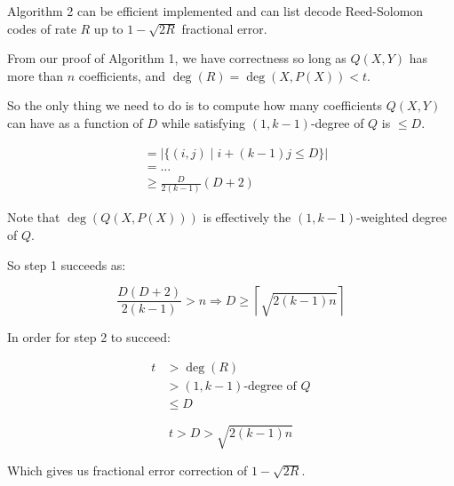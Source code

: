 \documentclass{idc_msc}
\begin{document}
Algorithm 2 can be efficient implemented and can list decode Reed-Solomon codes of rate \(R\) up to \(1 - \sqrt{2R}\) fractional error.

From our proof of Algorithm 1, we have correctness so long as \(Q(X,Y)\) has more than \(n\) coefficients, and \(\deg(R) = \deg(X,P(X)) < t\).

So the only thing we need to do is to compute how many coefficients \(Q(X,Y)\) can have as a function of \(D\) while satisfying \((1,k-1)\)-degree of \(Q\) is \(\le D\).

\[
\begin{aligned}
&= |\{(i,j) \mid i + (k-1)j \le D\}| \\
&= \ldots \\
&\ge \frac{D}{2(k-1)}(D+2)
\end{aligned}
\]

Note that \(\deg(Q(X,P(X)))\) is effectively the \((1,k-1)\)-weighted degree of \(Q\).

So step 1 succeeds as:

\[\frac{D(D+2)}{2(k-1)} > n \Rightarrow D \ge \left\lceil \sqrt{2(k-1)n}\right\rceil\]

In order for step 2 to succeed:

\[
\begin{aligned}
  t &> \deg(R) \\
  &> (1,k-1)\text{-degree of \(Q\)} \\
  & \le D
\end{aligned}
\]

\[t > D > \sqrt{2(k-1)n}\]

Which gives us fractional error correction of \(1 - \sqrt{2R}\).

\end{document}
